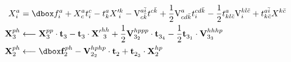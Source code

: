 \documentclass[thesis.tex]{subfiles}
\begin{document}
\begin{align}
  \xint{a}{i} &= \dboxed{\fint{a}{i}} + \xint{a}{c}\tamp{c}{i} - \tamp{a}{k}\xxint{k}{i} - \vint{a\bar{i}}{c\bar{k}}\tamp{c\bar{k}}{} + \frac{1}{2}\vint{a}{cd\bar{k}}\tamp{cd\bar{k}}{i} - \frac{1}{2}\tamp{a}{kl\bar{c}}\vint{kl\bar{c}}{i} + \tamp{a\bar{i}}{k\bar{c}}\xint{k\bar{c}}{} \notag \\
  \bxint{ph}{3} &\longleftarrow \bxint{pp}{3}\cdot\btamp{}{3} - \btamp{}{3}\cdot\bxxint{hh}{3} + \frac{1}{2}\bvint{hppp}{3_{2}}\cdot\btamp{}{3_{4}} - \frac{1}{2}\btamp{}{3_{1}}\cdot\bvint{hhhp}{3_{3}} \notag \\
  \bxint{ph}{2} &\longleftarrow \dboxed{\bfint{ph}{2}} - \bvint{hphp}{2_{2}}\cdot\btamp{}{2} + \btamp{}{2_{3}}\cdot\bxint{hp}{2}
\end{align}

\end{document}

